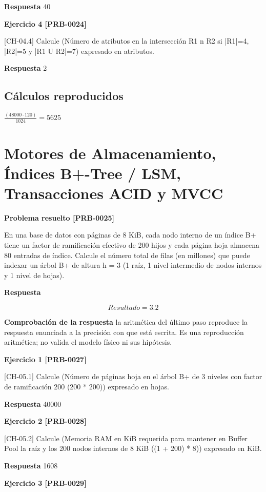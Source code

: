 \documentclass{book}
\begin{document}
\noindent\textbf{Respuesta} 40

\noindent\textbf{Ejercicio 4 [PRB-0024]}

[CH-04.4] Calcule (Número de atributos en la intersección R1 n R2 si |R1|=4, |R2|=5 y |R1 U R2|=7) expresado en atributos.

\noindent\textbf{Respuesta} 2

\subsection*{Cálculos reproducidos}

\(\frac{\left(48000\cdot 120\right)}{1024} = 5625\)

\section{Motores de Almacenamiento, Índices B+-Tree / LSM, Transacciones ACID y MVCC}

\noindent\textbf{Problema resuelto [PRB-0025]}

En una base de datos con páginas de 8 KiB, cada nodo interno de un índice B+ tiene un factor de ramificación efectivo de 200 hijos y cada página hoja almacena 80 entradas de índice. Calcule el número total de filas (en millones) que puede indexar un árbol B+ de altura h = 3 (1 raíz, 1 nivel intermedio de nodos internos y 1 nivel de hojas).

\noindent\textbf{Respuesta}

\[
Resultado = 3.2
\]

\noindent\textbf{Comprobación de la respuesta} la aritmética del último paso reproduce la respuesta enunciada a la precisión con que está escrita. Es una reproducción aritmética; no valida el modelo físico ni sus hipótesis.

\noindent\textbf{Ejercicio 1 [PRB-0027]}

[CH-05.1] Calcule (Número de páginas hoja en el árbol B+ de 3 niveles con factor de ramificación 200 (200 * 200)) expresado en hojas.

\noindent\textbf{Respuesta} 40000

\noindent\textbf{Ejercicio 2 [PRB-0028]}

[CH-05.2] Calcule (Memoria RAM en KiB requerida para mantener en Buffer Pool la raíz y los 200 nodos internos de 8 KiB ((1 + 200) * 8)) expresado en KiB.

\noindent\textbf{Respuesta} 1608

\noindent\textbf{Ejercicio 3 [PRB-0029]}
\end{document}
